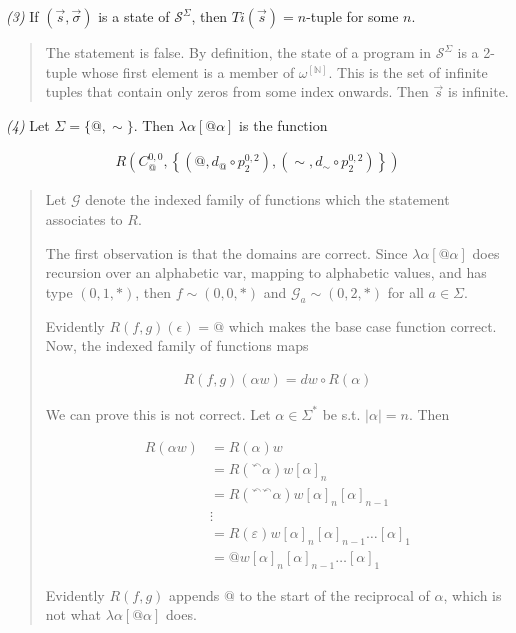 \documentclass[a4paper, 12pt]{article}
\begin{document}
\textit{(3)} If $(\vec{s}, \vec{\sigma})$ is a state of $\mathcal{S}^{\Sigma}$,
then $Ti(\vec{s}) = n$-tuple for some $n$.



\small
\begin{quote}

The statement is false. By definition, the state of a program 
in $\mathcal{S}^{\Sigma}$ is a 2-tuple whose first element is a member of
$\omega^{[\mathbb{N}]}$. This is the set of infinite tuples that contain only
zeros from some index onwards. Then $\vec{s}$ is infinite.

\end{quote}
\normalsize



\textit{(4)} Let $\Sigma = \{@, \sim \}$. Then $\lambda \alpha \left[  @\alpha
\right]$ is the function 

\begin{align*}
    R \left( C_{@}^{0, 0}, \left\{ (@, d_{@} \circ p_2^{0, 2}), (\sim, d_{\sim }
    \circ p_2^{0, 2}) \right\}  \right) 
\end{align*}


\small
\begin{quote}

Let $\mathcal{G}$ denote the indexed family of functions which the statement
associates to $R$. 

The first observation is that the domains are correct. Since $\lambda \alpha
\left[ @\alpha  \right]$ does recursion over an alphabetic var, mapping to
alphabetic values, and has type $(0, 1, *)$, then $f \sim (0, 0, *)$ and
$\mathcal{G}_a \sim (0, 2, *)$ for all $a \in \Sigma$.

Evidently $R(f, g)(\epsilon) = @$ which makes the base case function correct. Now, the
indexed family of functions maps

\begin{align*}
    R(f, g)(\alpha w) = dw \circ R(\alpha)
\end{align*}

We can prove this is not correct. Let $\alpha \in \Sigma^{*}$ be s.t. $|\alpha| =
n$. Then 

\begin{align*}
    R(\alpha w) &= R(\alpha)w \\ 
                &= R({}^{\curvearrowleft} \alpha) w[\alpha]_n \\ 
                &= R\left( {}^{\curvearrowleft} {}^{\curvearrowleft} \alpha
                \right) w[\alpha]_n[\alpha]_{n-1} \\ 
                &\vdots \\ 
                &=  R(\varepsilon ) w [\alpha]_n [\alpha]_{n-1} \ldots [\alpha]_1
                \\ 
                &= @w [\alpha]_n [\alpha]_{n-1} \ldots [\alpha]_1
\end{align*}

Evidently $R(f, g)$ appends $@$ to the start of the reciprocal of $\alpha$,
which is not what $\lambda \alpha \left[ @\alpha  \right]$ does.



\end{quote}
\normalsize
\end{document}
